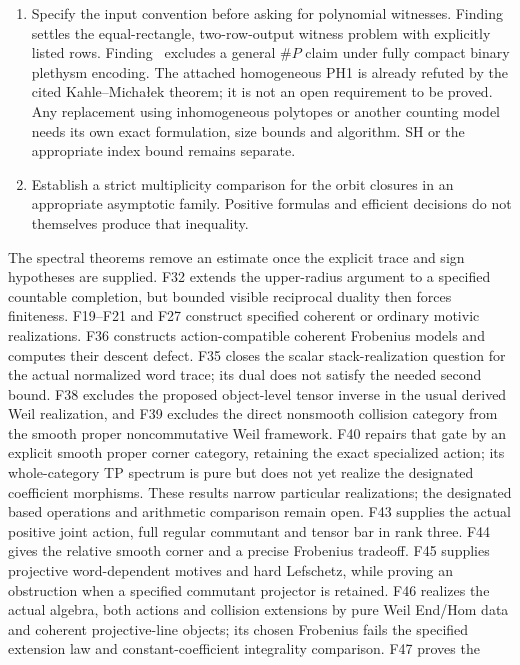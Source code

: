 \begin{enumerate}
\item {} Specify the input convention before asking for polynomial witnesses. Finding~ settles the equal-rectangle, two-row-output witness problem with explicitly listed rows. Finding~ excludes a general \(\#P\) claim under fully compact binary plethysm encoding. The attached homogeneous PH1 is already refuted by the cited Kahle--Micha{\l}ek theorem; it is not an open requirement to be proved. Any replacement using inhomogeneous polytopes or another counting model needs its own exact formulation, size bounds and algorithm. SH or the appropriate index bound remains separate.
\item {} Establish a strict multiplicity comparison for the orbit closures in an appropriate asymptotic family. Positive formulas and efficient decisions do not themselves produce that inequality.
\end{enumerate}
The spectral theorems remove an estimate once the explicit trace and sign hypotheses are supplied. F32 extends the upper-radius argument to a specified countable completion, but bounded visible reciprocal duality then forces finiteness. F19--F21 and F27 construct specified coherent or ordinary motivic realizations. F36 constructs action-compatible coherent Frobenius models and computes their descent defect. F35 closes the scalar stack-realization question for the actual normalized word trace; its dual does not satisfy the needed second bound. F38 excludes the proposed object-level tensor inverse in the usual derived Weil realization, and F39 excludes the direct nonsmooth collision category from the smooth proper noncommutative Weil framework. F40 repairs that gate by an explicit smooth proper corner category, retaining the exact specialized action; its whole-category TP spectrum is pure but does not yet realize the designated coefficient morphisms. These results narrow particular realizations; the designated based operations and arithmetic comparison remain open.  F43 supplies the actual positive joint action, full regular
commutant and tensor bar in rank three. F44 gives the relative
smooth corner and a precise Frobenius tradeoff. F45 supplies
projective word-dependent motives and hard Lefschetz, while proving
an obstruction when a specified commutant projector is retained.
F46 realizes the actual algebra, both actions and collision
extensions by pure Weil End/Hom data and coherent projective-line
objects; its chosen Frobenius fails the specified extension law
and constant-coefficient integrality comparison. F47 proves the
